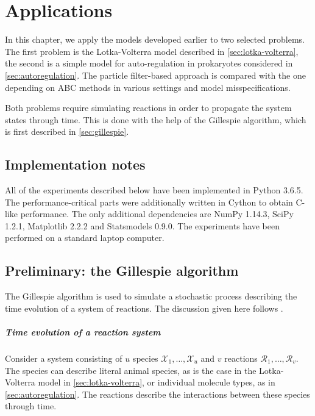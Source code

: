 \chapter{Applications}
\label{chap:applications}

In this chapter, we apply the models developed earlier to two selected problems. The first problem is the Lotka-Volterra model described in \autoref{sec:lotka-volterra}, the second is a simple model for auto-regulation in prokaryotes considered in \autoref{sec:autoregulation}. The particle filter-based approach is compared with the one depending on ABC methods in various settings and model misspecifications.

Both problems require simulating reactions in order to propagate the system states through time. This is done with the help of the Gillespie algorithm, which is first described in \autoref{sec:gillespie}.


\section{Implementation notes}
All of the experiments described below have been implemented in Python 3.6.5. The performance-critical parts were additionally written in Cython to obtain C-like performance. The only additional dependencies are NumPy 1.14.3, SciPy 1.2.1, Matplotlib 2.2.2 and Statsmodels 0.9.0. The experiments have been performed on a standard laptop computer.


\section{Preliminary: the Gillespie algorithm} \label{sec:gillespie}
The Gillespie algorithm \citep{gillespie1, gillespie2} is used to simulate a stochastic process describing the time evolution of a system of reactions. The discussion given here follows \cite{wilkinson-book}.

\paragraph{Time evolution of a reaction system}
Consider a system consisting of $u$ species $\mathcal{X}_1, \ldots, \mathcal{X}_u$ and $v$ reactions $\mathcal{R}_1, \ldots, \mathcal{R}_v$. The species can describe literal animal species, as is the case in the Lotka-Volterra model in \autoref{sec:lotka-volterra}, or individual molecule types, as in \autoref{sec:autoregulation}. The reactions describe the interactions between these species through time.

